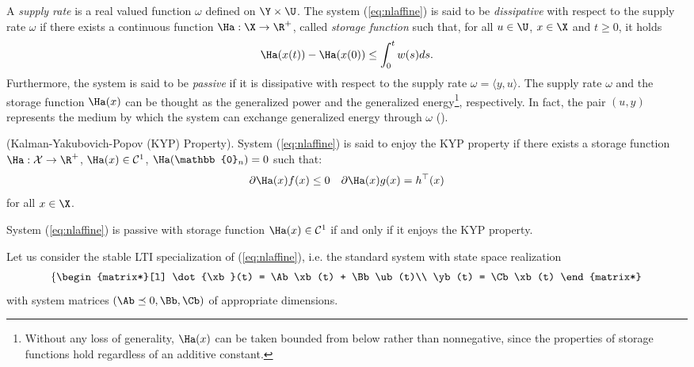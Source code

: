 A \textit{supply rate} is a real valued function $\omega$ defined on $\Y\times\U$. The  system (\ref{eq:nlaffine}) is said to be \textit{dissipative} with respect to the supply rate $\omega$ if there exists a continuous function $\Ha:\X\rightarrow\R^+$, called \textit{storage function} such that, for all $u\in\U$, $x\in\X$ and $t\geq 0$, it holds
%
\begin{equation*}
    \Ha(x(t))-\Ha(x(0)) \leq \int_0^tw(s)ds.
\end{equation*}
%
Furthermore, the system is said to be \textit{passive} if it is dissipative with respect to the supply rate $\omega = \langle y,u \rangle$. The supply rate $\omega$ and the storage function $\Ha(x)$ can be thought as the generalized power and the generalized energy\footnote{Without any loss of generality, $\Ha(x)$ can be taken bounded from below rather than nonnegative, since the properties of storage functions hold regardless of an additive constant.}, respectively. In fact, the pair $(u,y)$ represents the medium by which the system can exchange generalized energy through $\omega$ (\cite{secchi2007control}).
%
%
\begin{defn}(Kalman-Yakubovich-Popov (KYP) Property).
%
System (\ref{eq:nlaffine}) is said to enjoy the KYP property if there exists a storage function $\Ha:\mathcal{X}\rightarrow\R^+$, $\Ha(x)\in\mathcal{C}^1$, $\Ha(\mathbb{0}_n) = 0$ such that:
\begin{equation*}
        {\partial\Ha(x)}f(x)\leq 0\quad {\partial\Ha(x)}g(x)= h^\top(x)
\end{equation*}
%
for all $x\in\X$.
%
\end{defn}
%
\begin{prop}
%
System (\ref{eq:nlaffine}) is passive with storage function $\Ha(x)\in \mathcal{C}^1$ if and only if it enjoys the KYP property.
%
\end{prop}
%
Let us consider the stable LTI specialization of (\ref{eq:nlaffine}), i.e. the standard system with state space realization
%
\begin{equation}\label{eq:lsys}
\left\{
\begin{matrix*}[l]
\dot{\xb}(t) = \Ab\xb(t) + \Bb\ub(t)\\
\yb(t) = \Cb\xb(t)
\end{matrix*}
\right.
\end{equation}
with system matrices $(\Ab\preceq 0,\Bb,\Cb)$ of appropriate dimensions.
